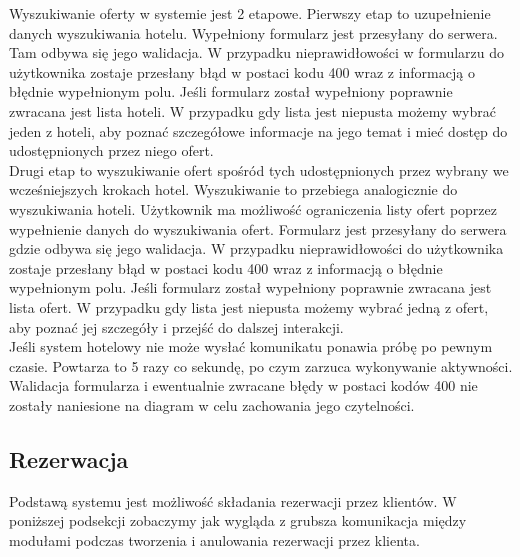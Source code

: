 \documentclass{article}
\begin{document}
Wyszukiwanie oferty w systemie jest 2 etapowe.\newline
Pierwszy etap to uzupełnienie danych wyszukiwania hotelu. Wypełniony formularz jest przesyłany do serwera. Tam odbywa się jego walidacja. W przypadku nieprawidłowości w formularzu do użytkownika zostaje przesłany błąd w postaci kodu 400 wraz z informacją o błędnie wypełnionym polu. Jeśli formularz został wypełniony poprawnie zwracana jest lista hoteli. W przypadku gdy lista jest niepusta możemy wybrać jeden z hoteli, aby poznać szczegółowe informacje na jego temat i mieć dostęp do udostępnionych przez niego ofert.\\ 
Drugi etap to wyszukiwanie ofert spośród tych udostępnionych przez wybrany we wcześniejszych krokach hotel. Wyszukiwanie to przebiega analogicznie do wyszukiwania hoteli. Użytkownik ma możliwość ograniczenia listy ofert poprzez wypełnienie danych do wyszukiwania ofert. Formularz jest przesyłany do serwera gdzie odbywa się jego walidacja. W przypadku nieprawidłowości do użytkownika zostaje przesłany błąd w postaci kodu 400 wraz z informacją o błędnie wypełnionym polu.
Jeśli formularz został wypełniony poprawnie zwracana jest lista ofert. W przypadku gdy lista jest niepusta możemy wybrać jedną z ofert, aby poznać jej szczegóły i przejść do dalszej interakcji.\\
Jeśli system hotelowy nie może wysłać komunikatu ponawia próbę po pewnym czasie. Powtarza to 5 razy co sekundę, po czym zarzuca wykonywanie aktywności.\\
Walidacja formularza i ewentualnie zwracane błędy w postaci kodów 400 nie zostały naniesione na diagram w celu zachowania jego czytelności. 

\subsection{Rezerwacja}
Podstawą systemu jest możliwość składania rezerwacji przez klientów. W poniższej podsekcji zobaczymy jak wygląda z grubsza komunikacja między modułami podczas tworzenia i anulowania rezerwacji przez klienta.
\end{document}
